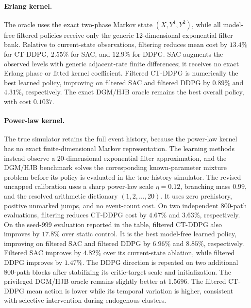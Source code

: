 \documentclass[11pt]{article}
\begin{document}
\paragraph{Erlang kernel.}
The oracle uses the exact two-phase Markov state \((X,Y^1,Y^2)\), while all
model-free filtered policies receive only the generic 12-dimensional
exponential filter bank. Relative to current-state observations, filtering
reduces mean cost by \(13.4\%\) for CT-DDPG, \(2.55\%\) for SAC, and \(12.9\%\)
for DDPG. SAC augments the observed levels with generic adjacent-rate finite
differences; it receives no exact Erlang phase or fitted kernel coefficient.
Filtered CT-DDPG is numerically the best learned policy, improving on filtered
SAC and filtered DDPG by \(0.89\%\) and \(4.31\%\), respectively. The exact
DGM/HJB oracle remains the best overall policy, with cost \(0.1037\).

\paragraph{Power-law kernel.}
The true simulator retains the full event history, because the power-law kernel
has no exact finite-dimensional Markov representation. The learning methods
instead observe a 20-dimensional exponential filter approximation, and the
DGM/HJB benchmark solves the corresponding known-parameter mixture problem
before its policy is evaluated in the true-history simulator. The revised
uncapped calibration uses a sharp power-law scale \(\eta=0.12\), branching mass
\(0.99\), and the resolved arithmetic dictionary \((1,2,\ldots,20)\). It uses
zero prehistory, positive unmarked jumps, and no event-count cost. On two
independent 800-path evaluations, filtering reduces CT-DDPG cost by \(4.67\%\)
and \(3.63\%\), respectively. On the seed-999 evaluation reported in the
table, filtered CT-DDPG also improves by \(17.8\%\) over static control. It is
the best model-free learned policy, improving on filtered SAC and filtered
DDPG by \(6.96\%\) and \(8.85\%\), respectively. Filtered SAC improves by
\(4.82\%\) over its current-state ablation, while filtered DDPG improves by
\(1.47\%\). The DDPG direction is repeated on two additional 800-path blocks
after stabilizing its critic-target scale and initialization. The privileged
DGM/HJB oracle remains slightly better at \(1.5696\). The filtered CT-DDPG mean
action is lower while its temporal
variation is higher, consistent with selective intervention during endogenous
clusters.
\end{document}
